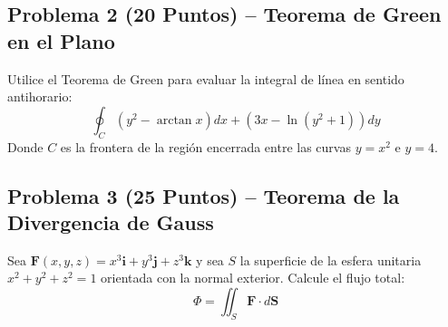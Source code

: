 \documentclass[11pt, letterpaper]{article}
\begin{document}
\vspace{3.5cm}

\subsection*{Problema 2 (20 Puntos) -- Teorema de Green en el Plano}
Utilice el Teorema de Green para evaluar la integral de línea en sentido antihorario:
\begin{equation*}
  \oint_C \left( y^2 - \arctan x \right) dx + \left( 3x - \ln(y^2 + 1) \right) dy
\end{equation*}
Donde $C$ es la frontera de la región encerrada entre las curvas $y = x^2$ e $y = 4$.

\vspace{3.5cm}

\subsection*{Problema 3 (25 Puntos) -- Teorema de la Divergencia de Gauss}
Sea $\mathbf{F}(x, y, z) = x^3 \mathbf{i} + y^3 \mathbf{j} + z^3 \mathbf{k}$ y sea $S$ la superficie de la esfera unitaria $x^2 + y^2 + z^2 = 1$ orientada con la normal exterior. Calcule el flujo total:
\begin{equation*}
  \Phi = \iint_S \mathbf{F} \cdot d\mathbf{S}
\end{equation*}
\end{document}
